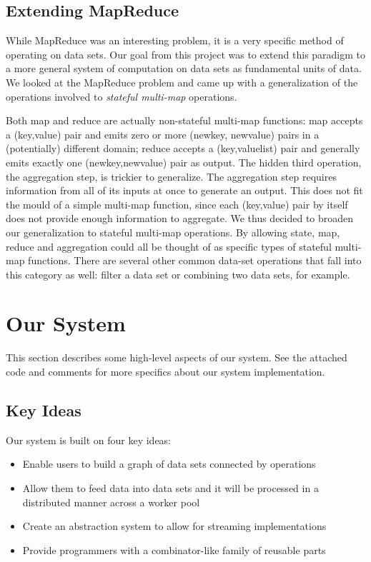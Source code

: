 \documentclass{article}
\begin{document}
\subsection{Extending MapReduce}

While MapReduce was an interesting problem, it is a very specific method of
operating on data sets. Our goal from this project was to extend this paradigm
to a more general system of computation on data sets as fundamental units of
data. We looked at the MapReduce problem and came up with a generalization
of the operations involved to \emph{stateful multi-map} operations.

Both map and reduce are actually non-stateful multi-map functions: map accepts a (key,value) pair
and emits zero or more (newkey, newvalue) pairs in a (potentially) different
domain; reduce accepts a (key,valuelist) pair and generally emits exactly
one (newkey,newvalue) pair as output. The hidden third operation, the aggregation
step, is trickier to generalize. The aggregation step requires information
from all of its inputs at once to generate an output. This does not fit the 
mould of a simple multi-map function, since each (key,value) pair by itself
does not provide enough information to aggregate. We thus decided to broaden our
generalization to stateful multi-map operations. By allowing state, map, reduce
and aggregation could all be thought of as specific types of stateful multi-map
functions. There are several other common data-set operations that fall into this category
as well: filter a data set or combining two data sets, for example.


\section{Our System}

This section describes some high-level aspects of our system. See the attached code and comments for more specifics about our system implementation.

\subsection{Key Ideas}

Our system is built on four key ideas:

\begin{itemize}

\item Enable users to build a graph of data sets connected by operations

\item Allow them to feed data into data sets and it will be processed in a distributed manner across a worker pool

\item Create an abstraction system to allow for streaming implementations

\item Provide programmers with a combinator-like family of reusable parts

\end{itemize}
\end{document}
